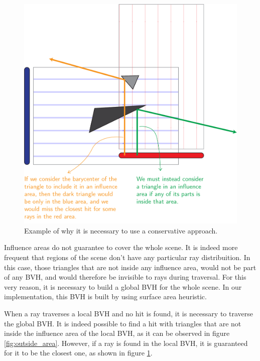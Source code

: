 \documentclass{PoliMi_MasterThesis}
\begin{document}
\begin{figure}[H]
    \centering
    \includegraphics[width=\textwidth*\real{0.7}]{Images/double_area.png}
    \caption{Example of why it is necessary to use a conservative approach.}
    \label{fig:conservative_inside}
\end{figure}

Influence areas do not guarantee to cover the whole scene. It is indeed more frequent that regions of the scene don't have any particular ray distribuition. In this case, those triangles that are not inside any influence area, would not be part of any BVH, and would therefore be invisible to rays during traversal. For this very reason, it is necessary to build a global BVH for the whole scene. In our implementation, this BVH is built by using surface area heuristic.

When a ray traverses a local BVH and no hit is found, it is necessary to traverse the global BVH. It is indeed possible to find a hit with triangles that are not inside the influence area of the local BVH, as it can be observed in figure \ref{fig:outside_area}. However, if a ray is found in the local BVH, it is guaranteed for it to be the closest one, as shown in figure \ref{fig:conservative_inside}.
\end{document}
